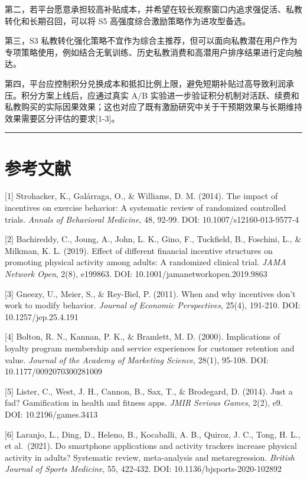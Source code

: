 \documentclass[
  12pt,
]{ctexart}
\begin{document}
第二，若平台愿意承担较高补贴成本，并希望在较长观察窗口内追求强促活、私教转化和长期召回，可以将 S5 高强度综合激励策略作为进攻型备选。

第三，S3 私教转化强化策略不宜作为综合主推荐，但可以面向私教潜在用户作为专项策略使用，例如结合无氧训练、历史私教消费和高潜用户排序结果进行定向触达。

第四，平台应控制积分兑换成本和抵扣比例上限，避免短期补贴过高导致利润承压。积分方案上线后，应通过真实 A/B 实验进一步验证积分机制对活跃、续费和私教购买的实际因果效果；这也对应了既有激励研究中关于干预期效果与长期维持效果需要区分评估的要求{[}1-3{]}。

\begin{center}\rule{0.5\linewidth}{0.5pt}\end{center}

\hypertarget{ux53c2ux8003ux6587ux732e}{%
\section*{参考文献}\label{ux53c2ux8003ux6587ux732e}}

{[}1{]} Strohacker, K., Galárraga, O., \& Williams, D. M. (2014). The impact of incentives on exercise behavior: A systematic review of randomized controlled trials. \emph{Annals of Behavioral Medicine}, 48, 92-99. DOI: 10.1007/s12160-013-9577-4

{[}2{]} Bachireddy, C., Joung, A., John, L. K., Gino, F., Tuckfield, B., Foschini, L., \& Milkman, K. L. (2019). Effect of different financial incentive structures on promoting physical activity among adults: A randomized clinical trial. \emph{JAMA Network Open}, 2(8), e199863. DOI: 10.1001/jamanetworkopen.2019.9863

{[}3{]} Gneezy, U., Meier, S., \& Rey-Biel, P. (2011). When and why incentives don't work to modify behavior. \emph{Journal of Economic Perspectives}, 25(4), 191-210. DOI: 10.1257/jep.25.4.191

{[}4{]} Bolton, R. N., Kannan, P. K., \& Bramlett, M. D. (2000). Implications of loyalty program membership and service experiences for customer retention and value. \emph{Journal of the Academy of Marketing Science}, 28(1), 95-108. DOI: 10.1177/0092070300281009

{[}5{]} Lister, C., West, J. H., Cannon, B., Sax, T., \& Brodegard, D. (2014). Just a fad? Gamification in health and fitness apps. \emph{JMIR Serious Games}, 2(2), e9. DOI: 10.2196/games.3413

{[}6{]} Laranjo, L., Ding, D., Heleno, B., Kocaballi, A. B., Quiroz, J. C., Tong, H. L., et al.~(2021). Do smartphone applications and activity trackers increase physical activity in adults? Systematic review, meta-analysis and metaregression. \emph{British Journal of Sports Medicine}, 55, 422-432. DOI: 10.1136/bjsports-2020-102892
\end{document}
